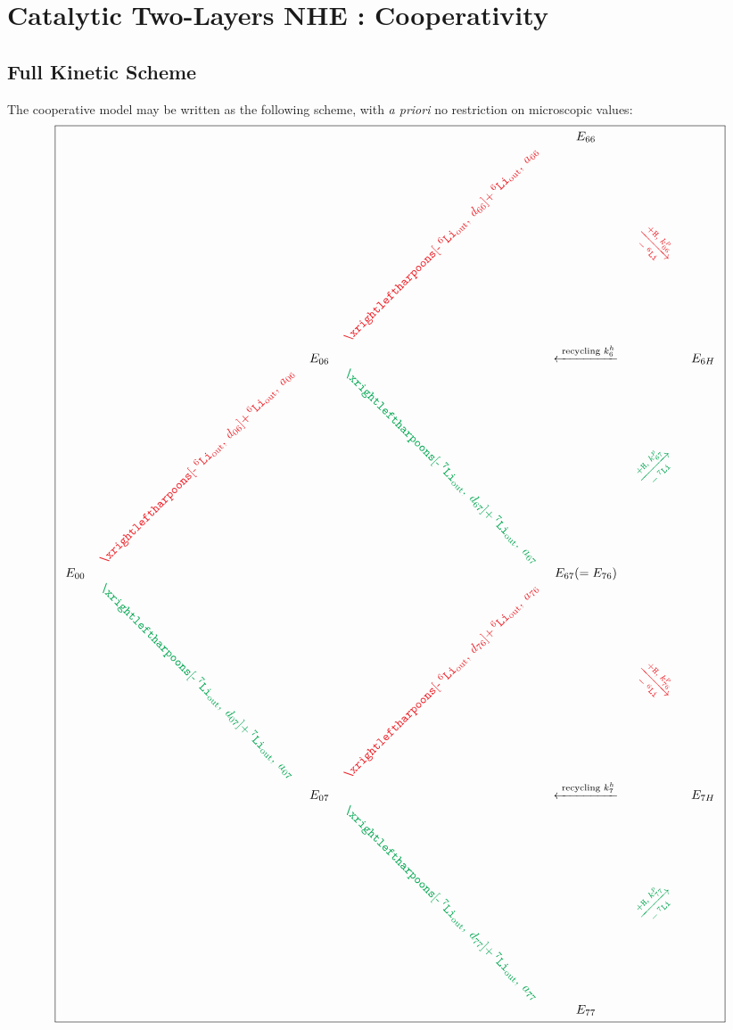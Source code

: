 \documentclass[aps,onecolumn,11pt]{revtex4}
\newcommand{\mychem}[1]{\mathtt{#1}}
\newcommand{\spLi}[1]{{\!~^{#1}\mychem{Li}}}
\newcommand{\spproton}{\mychem{H}}
\newcommand{\myout}[1]{{#1}_{\mathrm{out}}}
\newcommand{\spLiOut}[1]{\myout{\spLi{#1}}}
\newcommand{\myrotate}[2]{\rotatebox[origin=c]{#1}{#2}}
\newcommand{\inpLi}[1]{\text{+}\spLiOut{#1}}
\newcommand{\outLi}[1]{\text{-}\spLiOut{#1}}
\newcommand{\mycolor}[2]{\ifthenelse{\equal{#1}{6}}{{\color{Red}#2}}{{\color{Green}#2}}}
\begin{document}
\section{Catalytic Two-Layers NHE : Cooperativity}
\subsection{Full Kinetic Scheme}
The cooperative model may be written as the following scheme, with \textit{a priori} no restriction on microscopic values:
{
\Large
\begin{equation}
\boxed{
\begin{array}{ccccccc}
 & &        &                                                  & E_{66} & & \\
 & &        & \myrotate{45}{\mycolor{6}{$\xrightleftharpoons[\outLi{6},\;d_{66}]{\inpLi{6},\;a_{66}}$}} & &  \myrotate{-45}{\mycolor{6}{$\xrightarrow[-\spLi{6}]{+ \spproton, \; k^p_{66}}$}}& \\
 & & E_{06} &  & \xleftarrow{\text{ recycling } k^h_6 } & & E_{6H}\\
 &  \myrotate{45}{\mycolor{6}{$\xrightleftharpoons[\outLi{6},\;d_{06}]{\inpLi{6},\;a_{06}}$}} &   & \myrotate{-45}{\mycolor{7}{$\xrightleftharpoons[\outLi{7},\;d_{67}]{\inpLi{7},\;a_{67}}$}} & & \myrotate{45}{\mycolor{7}{$\xrightarrow[-\spLi{7}]{+ \spproton, \; k^p_{67}}$}}&\\
E_{00} & &  & & E_{67}(=E_{76}) & & \\ 
  & \myrotate{-45}{\mycolor{7}{$\xrightleftharpoons[\outLi{7},\;d_{07}]{\inpLi{7},\;a_{07}}$}} &  & \myrotate{45}{\mycolor{6}{$\xrightleftharpoons[\outLi{6},\;d_{76}]{\inpLi{6},\;a_{76}}$}} & & \myrotate{-45}{\mycolor{6}{$\xrightarrow[-\spLi{6}]{+ \spproton, \; k^p_{76}}$}} & \\
  & & E_{07} &   & \xleftarrow{\text{ recycling } k^h_7 } & & E_{7H}\\
  & &  & \myrotate{-45}{\mycolor{7}{$\xrightleftharpoons[\outLi{7},\;d_{77}]{\inpLi{7},\;a_{77}}$}} & & \myrotate{45}{\mycolor{7}{$\xrightarrow[-\spLi{7}]{+ \spproton, \; k^p_{77}}$}} &\\
  & &  &  & E_{77} & &\\

 \end{array}
 }
\end{equation}
}
\end{document}

